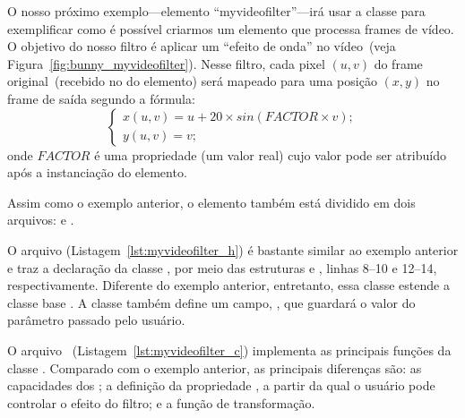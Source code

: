 O nosso próximo exemplo---elemento ``myvideofilter''---irá usar a classe
 para exemplificar como é possível criarmos um elemento que
processa frames de vídeo.  O objetivo do nosso filtro é aplicar um ``efeito de
onda'' no vídeo~(veja Figura~\ref{fig:bunny_myvideofilter}).  Nesse filtro,
cada pixel $(u, v)$ do frame original~(recebido no  do elemento)
será mapeado para uma posição $(x, y)$ no frame de saída segundo a fórmula:
\begin{equation}
  \begin{cases}
  x(u, v) = u + 20 \times sin ( FACTOR \times v); \\
  y(u, v) = v;
  \end{cases}
  \label{eq:wave_filter}
\end{equation}
onde $FACTOR$ é uma propriedade (um valor real) cujo valor pode ser atribuído
após a instanciação do elemento.

Assim como o exemplo anterior, o elemento  também está
dividido em dois arquivos:  e .

O arquivo  (Listagem~\ref{lst:myvideofilter_h}) é bastante
similar ao exemplo anterior e traz a declaração da classe ,
por meio das estruturas  e ,
linhas 8--10 e 12--14, respectivamente.  Diferente do exemplo anterior,
entretanto, essa classe estende a classe base .  A classe
 também define um campo, , que guardará o valor do
parâmetro passado pelo usuário.



O arquivo ~(Listagem~\ref{lst:myvideofilter_c}) implementa
as principais funções da classe .  Comparado com o exemplo
anterior, as principais diferenças são: as capacidades dos ; a
definição da propriedade , a partir da qual o usuário pode controlar 
o efeito do filtro; e a função de transformação.



